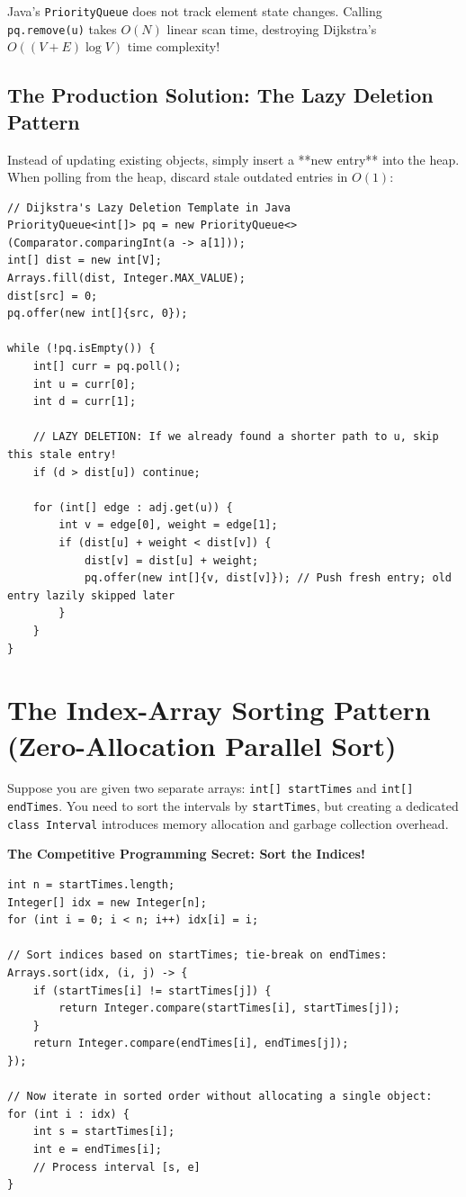 \documentclass[10pt,journal,compsoc,onecolumn]{IEEEtran}
\begin{document}
Java's \texttt{PriorityQueue} does not track element state changes. Calling \texttt{pq.remove(u)} takes $O(N)$ linear scan time, destroying Dijkstra's $O((V + E) \log V)$ time complexity!

\subsection{The Production Solution: The Lazy Deletion Pattern}
Instead of updating existing objects, simply insert a **new entry** into the heap. When polling from the heap, discard stale outdated entries in $O(1)$:

\begin{verbatim}
// Dijkstra's Lazy Deletion Template in Java
PriorityQueue<int[]> pq = new PriorityQueue<>(Comparator.comparingInt(a -> a[1]));
int[] dist = new int[V];
Arrays.fill(dist, Integer.MAX_VALUE);
dist[src] = 0;
pq.offer(new int[]{src, 0});

while (!pq.isEmpty()) {
    int[] curr = pq.poll();
    int u = curr[0];
    int d = curr[1];

    // LAZY DELETION: If we already found a shorter path to u, skip this stale entry!
    if (d > dist[u]) continue;

    for (int[] edge : adj.get(u)) {
        int v = edge[0], weight = edge[1];
        if (dist[u] + weight < dist[v]) {
            dist[v] = dist[u] + weight;
            pq.offer(new int[]{v, dist[v]}); // Push fresh entry; old entry lazily skipped later
        }
    }
}
\end{verbatim}

\section{The Index-Array Sorting Pattern (Zero-Allocation Parallel Sort)}
\label{sec:index_sorting}

Suppose you are given two separate arrays: \texttt{int[] startTimes} and \texttt{int[] endTimes}. You need to sort the intervals by \texttt{startTimes}, but creating a dedicated \texttt{class Interval} introduces memory allocation and garbage collection overhead.

\textbf{The Competitive Programming Secret: Sort the Indices!}
\begin{verbatim}
int n = startTimes.length;
Integer[] idx = new Integer[n];
for (int i = 0; i < n; i++) idx[i] = i;

// Sort indices based on startTimes; tie-break on endTimes:
Arrays.sort(idx, (i, j) -> {
    if (startTimes[i] != startTimes[j]) {
        return Integer.compare(startTimes[i], startTimes[j]);
    }
    return Integer.compare(endTimes[i], endTimes[j]);
});

// Now iterate in sorted order without allocating a single object:
for (int i : idx) {
    int s = startTimes[i];
    int e = endTimes[i];
    // Process interval [s, e]
}
\end{verbatim}
\end{document}
